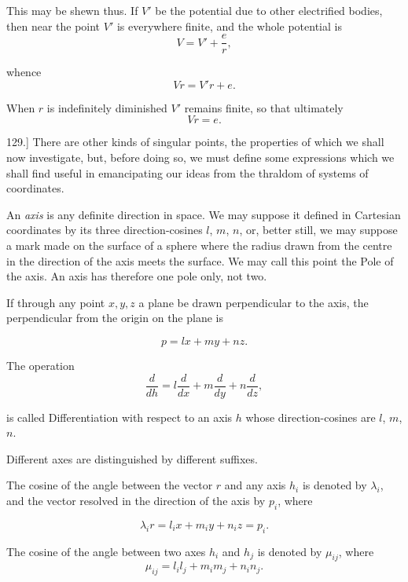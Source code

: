 \documentclass[11pt,a4paper]{article}
\begin{document}
This may be shewn thus. If $V'$ be the potential due to other electrified bodies, then near the point $V'$ is everywhere finite, and the whole potential is
\[
V=V'+\frac{e}{r},
\]

whence
\[
Vr=V'r+e.
\]

When $r$ is indefinitely diminished $V'$ remains finite, so that ultimately
\[
Vr=e.
\]

129.] There are other kinds of singular points, the properties of which we shall now investigate, but, before doing so, we must define some expressions which we shall find useful in emancipating our ideas from the thraldom of systems of coordinates.

An \emph{axis} is any definite direction in space. We may suppose it defined in Cartesian coordinates by its three direction-cosines $l$, $m$, $n$, or, better still, we may suppose a mark made on the surface of a sphere where the radius drawn from the centre in the direction of the axis meets the surface. We may call this point the Pole of the axis. An axis has therefore one pole only, not two.

If through any point $x,y,z$ a plane be drawn perpendicular to the axis, the perpendicular from the origin on the plane is

\begin{equation}\tag{2}
p=lx+my+nz.
\end{equation}

The operation 
\begin{equation}\tag{3}
\frac{d}{dh}=l\frac{d}{dx}+m\frac{d}{dy}+n\frac{d}{dz},
\end{equation}

is called Differentiation with respect to an axis $h$ whose direction-cosines are $l$, $m$, $n$.

Different axes are distinguished by different suffixes.

The cosine of the angle between the vector $r$ and any axis $h_i$ is denoted by $\lambda_i$, and the vector resolved in the direction of the axis by $p_i$, where

\begin{equation}\tag{4}
\lambda_i r=l_i x+m_i y+n_i z=p_i.
\end{equation}

The cosine of the angle between two axes $h_i$ and $h_j$ is denoted by $\mu_{ij}$, where
\begin{equation}\tag{5}
\mu_{ij}=l_i l_j+m_i m_j+n_i n_j.
\end{equation}
\end{document}
